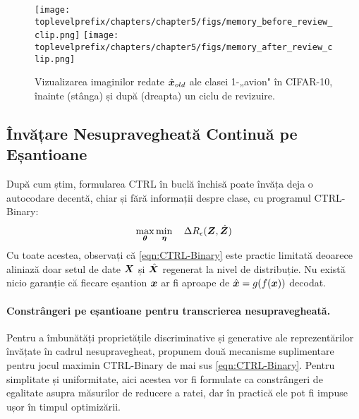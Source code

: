 \documentclass[../../book-main_ro.tex]{subfiles}
\begin{document}
\begin{figure}
\centering
\texttt{[image: \\toplevelprefix/chapters/chapter5/figs/memory\_before\_review\_clip.png]}
\texttt{[image: \\toplevelprefix/chapters/chapter5/figs/memory\_after\_review\_clip.png]}
 \caption{\small Vizualizarea imaginilor redate $\hat{\bm{x}}_{old}$ ale clasei 1-„avion" în CIFAR-10, înainte (stânga) și după (dreapta) un ciclu de revizuire.}
\label{fig:memory_review}
\end{figure}


\subsection{Învățare Nesupravegheată Continuă pe Eșantioane}
\label{sec:sample-wise-incremental}

După cum știm, formularea CTRL în buclă închisă poate învăța deja o autocodare decentă, chiar și fără informații despre clase, cu programul CTRL-Binary:
\begin{align}
      \max_{\bm \theta} \min_{\bm \eta} \quad \Delta R_\epsilon(\bm{Z}, \hat{\bm{Z}})
 \label{eqn:CTRL-Binary}
\end{align}
Cu toate acestea, observați că \eqref{eqn:CTRL-Binary} este practic limitată deoarece aliniază doar setul de date $\bm{X}$ și $\hat {\bm{X}}$ regenerat la nivel de distribuție.
Nu există nicio garanție că fiecare eșantion $\bm{x}$ ar fi aproape de $\hat {\bm{x}} = g(f(\bm{x}))$ decodat.

\paragraph{Constrângeri pe eșantioane pentru transcrierea nesupravegheată.}
\label{sec:constraints}
Pentru a îmbunătăți proprietățile discriminative și generative ale reprezentărilor învățate în cadrul nesupravegheat, propunem două mecanisme suplimentare pentru jocul maximin CTRL-Binary de mai sus \eqref{eqn:CTRL-Binary}. Pentru simplitate și uniformitate, aici acestea vor fi formulate ca constrângeri de egalitate asupra măsurilor de reducere a ratei, dar în practică ele pot fi impuse ușor în timpul optimizării.
\end{document}
